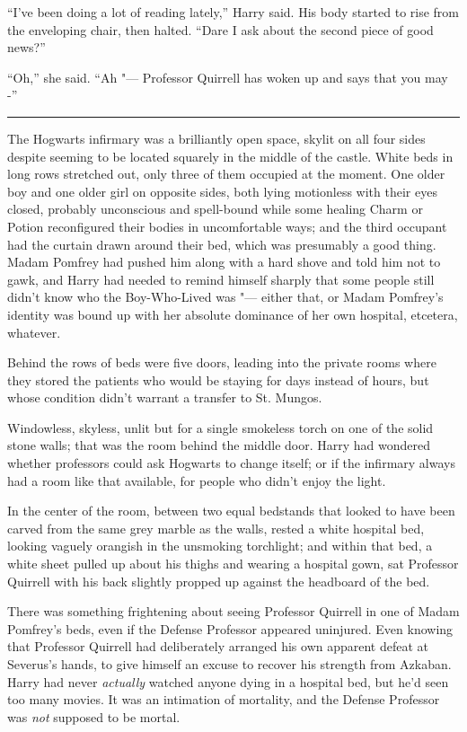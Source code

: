 ``I've been doing a lot of reading lately,'' Harry said. His body
started to rise from the enveloping chair, then halted. ``Dare I ask
about the second piece of good news?''

``Oh,'' she said. ``Ah "--- Professor Quirrell has woken up and says that
you may -''

\begin{center}\rule{3in}{0.4pt}\end{center}

The Hogwarts infirmary was a brilliantly open space, skylit on all four
sides despite seeming to be located squarely in the middle of the
castle. White beds in long rows stretched out, only three of them
occupied at the moment. One older boy and one older girl on opposite
sides, both lying motionless with their eyes closed, probably
unconscious and spell-bound while some healing Charm or Potion
reconfigured their bodies in uncomfortable ways; and the third occupant
had the curtain drawn around their bed, which was presumably a good
thing. Madam Pomfrey had pushed him along with a hard shove and told him
not to gawk, and Harry had needed to remind himself sharply that some
people still didn't know who the Boy-Who-Lived was "--- either that, or
Madam Pomfrey's identity was bound up with her absolute dominance of her
own hospital, etcetera, whatever.

Behind the rows of beds were five doors, leading into the private rooms
where they stored the patients who would be staying for days instead of
hours, but whose condition didn't warrant a transfer to St. Mungos.

Windowless, skyless, unlit but for a single smokeless torch on one of
the solid stone walls; that was the room behind the middle door. Harry
had wondered whether professors could ask Hogwarts to change itself; or
if the infirmary always had a room like that available, for people who
didn't enjoy the light.

In the center of the room, between two equal bedstands that looked to
have been carved from the same grey marble as the walls, rested a white
hospital bed, looking vaguely orangish in the unsmoking torchlight; and
within that bed, a white sheet pulled up about his thighs and wearing a
hospital gown, sat Professor Quirrell with his back slightly propped up
against the headboard of the bed.

There was something frightening about seeing Professor Quirrell in one
of Madam Pomfrey's beds, even if the Defense Professor appeared
uninjured. Even knowing that Professor Quirrell had deliberately
arranged his own apparent defeat at Severus's hands, to give himself an
excuse to recover his strength from Azkaban. Harry had never
\emph{actually} watched anyone dying in a hospital bed, but he'd seen
too many movies. It was an intimation of mortality, and the Defense
Professor was \emph{not} supposed to be mortal.

